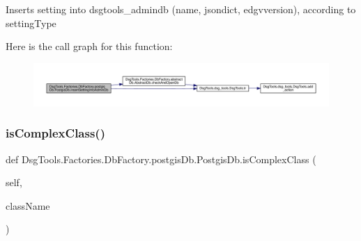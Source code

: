 \begin{DoxyVerb}Inserts setting into dsgtools_admindb (name, jsondict, edgvversion),
according to settingType
\end{DoxyVerb}
 Here is the call graph for this function\+:
\nopagebreak
\begin{figure}[H]
\begin{center}
\leavevmode
\includegraphics[width=350pt]{class_dsg_tools_1_1_factories_1_1_db_factory_1_1postgis_db_1_1_postgis_db_ab0b5f32dfd0746bdbf5fa2c43551ee47_cgraph}
\end{center}
\end{figure}
\mbox{\label{class_dsg_tools_1_1_factories_1_1_db_factory_1_1postgis_db_1_1_postgis_db_a42c96b02611844fcf4a09d2bc0463947}} 
\subsubsection{\texorpdfstring{is\+Complex\+Class()}{isComplexClass()}}
{\footnotesize\ttfamily def Dsg\+Tools.\+Factories.\+Db\+Factory.\+postgis\+Db.\+Postgis\+Db.\+is\+Complex\+Class (\begin{DoxyParamCaption}\item[{}]{self,  }\item[{}]{class\+Name }\end{DoxyParamCaption})}


